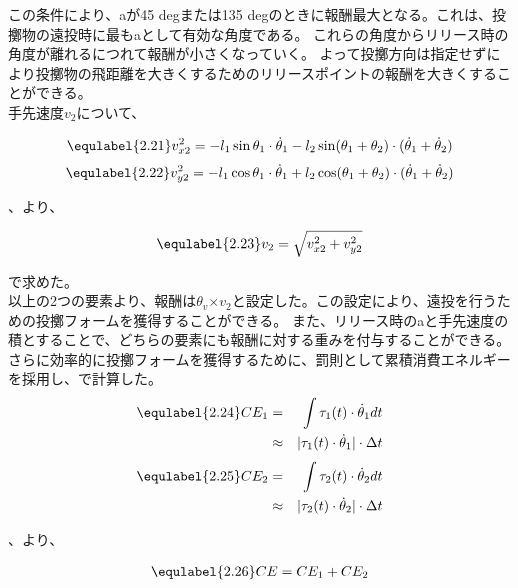この条件により、aが45 degまたは135 degのときに報酬最大となる。これは、投擲物の遠投時に最もaとして有効な角度である。
これらの角度からリリース時の角度が離れるにつれて報酬が小さくなっていく。
よって投擲方向は指定せずにより投擲物の飛距離を大きくするためのリリースポイントの報酬を大きくすることができる。\\
手先速度$v_{2}$について、

\begin{eqnarray}
  \equlabel{2.21}
  v_{x2}^{2}=-l_{1}\sin\theta_{1}\cdot\dot{\theta}_{1}-l_2\sin(\theta_{1}+\theta_{2})\cdot(\dot{\theta}_{1}+\dot{\theta}_{2})
\end{eqnarray}
\begin{eqnarray}
  \equlabel{2.22}
  v_{y2}^{2}=-l_{1}\cos\theta_{1}\cdot\dot{\theta}_{1}+l_2\cos(\theta_{1}+\theta_{2})\cdot(\dot{\theta}_{1}+\dot{\theta}_{2})
\end{eqnarray}

、より、

\begin{eqnarray}
  \equlabel{2.23}
  v_{2}=\sqrt{v_{x2}^{2}+v_{y2}^{2}}
\end{eqnarray}

で求めた。\\

以上の2つの要素より、報酬は$\theta_{v}$$\times$$v_{2}$と設定した。この設定により、遠投を行うための投擲フォームを獲得することができる。
また、リリース時のaと手先速度の積とすることで、どちらの要素にも報酬に対する重みを付与することができる。\\
さらに効率的に投擲フォームを獲得するために、罰則として累積消費エネルギーを採用し、で計算した。\\
\begin{eqnarray}
  \equlabel{2.24}
  CE_{1}&=&\int \tau_{1}(t)\cdot\dot{\theta}_{1} dt\\
        &\approx&|\tau_{1}(t)\cdot\dot{\theta}_{1}|\cdot\Delta t
\end{eqnarray}
\begin{eqnarray}
  \equlabel{2.25}
  CE_{2}&=&\int \tau_{2}(t)\cdot\dot{\theta}_{2} dt\\
        &\approx&|\tau_{2}(t)\cdot\dot{\theta}_{2}|\cdot\Delta t
\end{eqnarray}

、より、

\begin{eqnarray}
  \equlabel{2.26}
  CE=CE_{1}+CE_{2}
\end{eqnarray}

